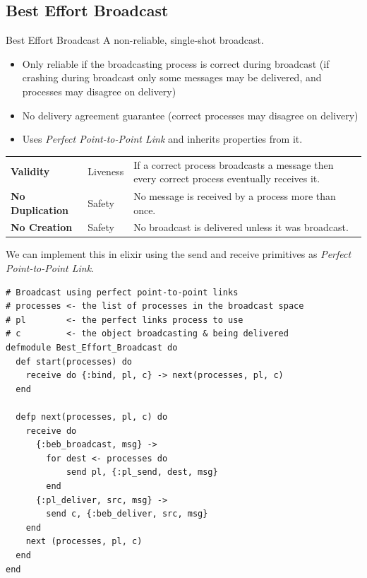 \subsection{Best Effort Broadcast}
\begin{definitionbox}{Best Effort Broadcast}
    A non-reliable, single-shot broadcast.
    \begin{itemize}
        \item Only reliable if the broadcasting process is correct during broadcast (if crashing during broadcast only some messages may be delivered, and processes may disagree on delivery)
        \item No delivery agreement guarantee (correct processes may disagree on delivery)
        \item Uses \textit{Perfect Point-to-Point Link} and inherits properties from it.
    \end{itemize} 
    \begin{center}
        \begin{tabular}{l l p{}}
            \textbf{Validity} & Liveness & If a correct process broadcasts a message then every correct process eventually receives it. \\
            \textbf{No Duplication} & Safety & No message is received by a process more than once. \\
            \textbf{No Creation} & Safety & No broadcast is delivered unless it was broadcast. \\
        \end{tabular}
    \end{center}
\end{definitionbox}
We can implement this in elixir using the send and receive primitives as \textit{Perfect Point-to-Point Link}.
\begin{verbatim}
# Broadcast using perfect point-to-point links
# processes <- the list of processes in the broadcast space
# pl        <- the perfect links process to use
# c         <- the object broadcasting & being delivered
defmodule Best_Effort_Broadcast do
  def start(processes) do
    receive do {:bind, pl, c} -> next(processes, pl, c)
  end

  defp next(processes, pl, c) do
    receive do
      {:beb_broadcast, msg} -> 
        for dest <- processes do
            send pl, {:pl_send, dest, msg}
        end
      {:pl_deliver, src, msg} ->
        send c, {:beb_deliver, src, msg}
    end
    next (processes, pl, c)
  end
end
\end{verbatim}


